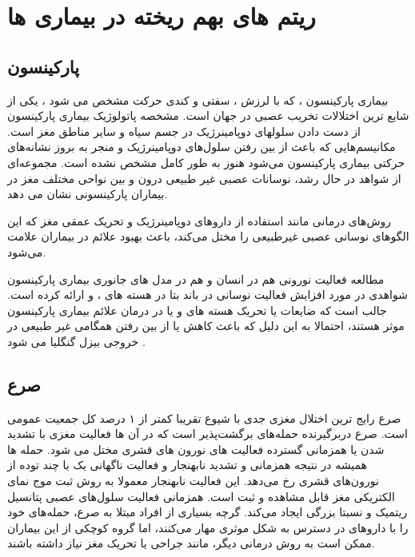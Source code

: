 
\section{ ریتم های بهم ریخته در بیماری ها}

\subsection{پارکینسون}
بیماری پارکینسون  ، که با لرزش ، سفتی و کندی حرکت مشخص می شود ، یکی از شایع ترین اختلالات تخریب عصبی در جهان است. مشخصه پاتولوژیک بیماری پارکینسون از دست دادن سلولهای دوپامینرژیک در جسم سیاه
و سایر مناطق مغز است.
مکانیسم‌هایی که باعث از بین رفتن سلول‌های دوپامینرژیک و منجر به بروز نشانه‌های حرکتی بیماری پارکینسون می‌شود هنوز به طور کامل مشخص نشده است. مجموعه‌ای از شواهد در حال رشد، نوسانات عصبی غیر طبیعی درون و بین نواحی مختلف مغز در بیماران پارکینسونی نشان می دهد. 

 روش‌های درمانی مانند استفاده از داروهای دوپامینرژیک و تحریک عمقی مغز که این الگوهای نوسانی عصبی غیرطبیعی را مختل می‌کند، باعث بهبود علائم در بیماران علامت می‌شود.

مطالعه فعالیت نورونی هم در انسان و هم در مدل های جانوری بیماری پارکینسون شواهدی در مورد افزایش فعالیت نوسانی در باند بتا در هسته های 
، 
و 
ارائه کرده است. جالب است که ضایعات یا تحریک هسته های 
 و یا
در درمان علائم بیماری پارکینسون موثر هستند، احتمالا به این دلیل که باعث کاهش یا از بین رفتن همگامی غیر طبیعی در خروجی بیزل گنگلیا می شود
\cite{chen2011stimulation, moro2002impact, jenkinson2011new, hammond2007pathological}
.
\subsection{صرع}
صرع رایج ترین اختلال مغزی جدی با شیوع تقریبا کمتر از ۱ درصد کل جمعیت عمومی است.
صرع دربرگیرنده حمله‌های برگشت‌پذیر است که در آن ها فعالیت مغزی با تشدید شدن یا همزمانی گسترده فعالیت های نورون های قشری
مختل می شود. 
حمله ها همیشه در نتیجه همزمانی و تشدید نابهنجار و فعالیت ناگهانی یک یا چند توده از نورون‌های‌ قشری رخ می‌دهد. این فعالیت نابهنجار معمولا به روش ثبت موج نمای الکتریکی مغز
قابل مشاهده و ثبت است. همزمانی فعالیت سلول‌های عصبی پتانسیل ریتمیک و نسبتا بزرگی ایجاد می‌کند. گرچه بسیاری از افراد مبتلا به صرع، حمله‌های خود را با داروهای در دسترس به شکل موثری مهار می‌کنند، اما گروه کوچکی از این بیماران ممکن است به روش درمانی دیگر، مانند جراحی یا تحریک مغز نیاز داشته باشند.

